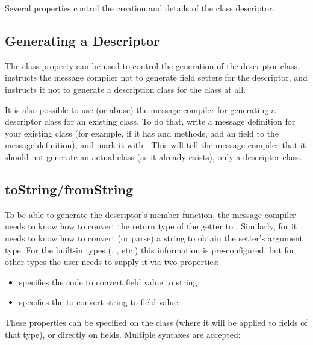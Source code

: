 Several properties control the creation and details of the class descriptor.


\subsection{Generating a Descriptor}
\label{sec:msg-defs:descriptor-property}

The  class property can be used to control the generation
of the descriptor class.  instructs the message
compiler not to generate field setters for the descriptor, and
 instructs it not to generate a description class
for the class at all.

It is also possible to use (or abuse) the message compiler for generating a
descriptor class for an existing class. To do that, write a message definition
for your existing class (for example, if it has  and
 methods, add an  field to the message
definition), and mark it with . This will tell the
message compiler that it should not generate an actual class (as it already
exists), only a descriptor class.


\subsection{toString/fromString}
\label{sec:msg-defs:descriptor-tostring}

To be able to generate the descriptor's  member
function, the message compiler needs to know how to convert the return type of
the getter to . Similarly, for  it
needs to know how to convert (or parse) a string to obtain the setter's argument
type. For the built-in types (, , etc.) this information is
pre-configured, but for other types the user needs to supply it via two
properties:

\begin{itemize}
  \item {} specifies the code to convert field value to string;
  \item {} specifies the to convert string to field value.
\end{itemize}

These properties can be specified on the class (where it will be applied to
fields of that type), or directly on fields. Multiple syntaxes are accepted:

